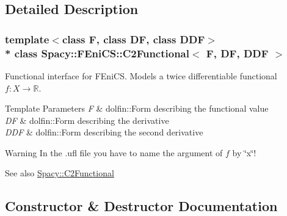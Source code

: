 \subsection{Detailed Description}
\subsubsection*{template$<$class F, class DF, class D\+DF$>$\\*
class Spacy\+::\+F\+Eni\+C\+S\+::\+C2\+Functional$<$ F, D\+F, D\+D\+F $>$}

Functional interface for F\+Eni\+CS. Models a twice differentiable functional $f:X\rightarrow \mathbb{R}$. 


\begin{DoxyTemplParams}{Template Parameters}
{\em F} & dolfin\+::\+Form describing the functional value \\
\hline
{\em DF} & dolfin\+::\+Form describing the derivative \\
\hline
{\em D\+DF} & dolfin\+::\+Form describing the second derivative \\
\hline
\end{DoxyTemplParams}
\begin{DoxyWarning}{Warning}
In the .ufl file you have to name the argument of $f$ by \char`\"{}x\char`\"{}! 
\end{DoxyWarning}
\begin{DoxySeeAlso}{See also}
\hyperlink{classSpacy_1_1C2Functional}{Spacy\+::\+C2\+Functional} 
\end{DoxySeeAlso}


\subsection{Constructor \& Destructor Documentation}
